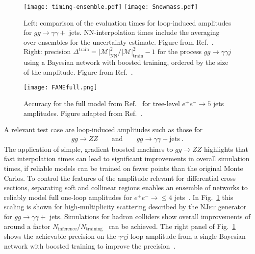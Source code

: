 \documentclass[submission,Phys]{SciPost}
\begin{document}
\begin{figure}[t]
    \centering
    \texttt{[image: timing-ensemble.pdf]}
    \hspace*{0.06\textwidth}
    \texttt{[image: Snowmass.pdf]}
    \caption{Left: comparison of the evaluation times for loop-induced amplitudes for $gg\to \gamma\gamma+$ jets. NN-interpolation times include the averaging over ensembles for the uncertainty estimate. Figure from Ref.~\cite{Aylett-Bullock:2021hmo}. Right: precision $\Delta^\text{train} = |\mathcal{M}|_\text{NN}^2/|\mathcal{M}|_\text{train}^2-1$ for the process $gg\to \gamma\gamma j$ using a Bayesian network with boosted training, ordered by the size of the amplitude. Figure from Ref.~\cite{Badger_future}.}
    \label{fig:nnamps-timing}
\end{figure}

\begin{figure}[b!]
    \texttt{[image: FAMEfull.png]}
    \caption{Accuracy for the full model from Ref.~\cite{Maitre:2021uaa}  for tree-level $e^+e^-\to 5$ jets amplitudes. Figure adapted from Ref.~\cite{Maitre:2021uaa}.}
    \label{fig:FAMEfull}
\end{figure}

A relevant test case are loop-induced amplitudes such as those for
%
\begin{align}
gg\to ZZ
\qquad \text{and} \qquad 
gg\to \gamma\gamma +\text{jets} \; . 
\end{align}
%
The application of simple, gradient boosted machines to $gg\to ZZ$ highlights that fast interpolation times can lead to significant improvements in overall simulation times, if reliable models can be trained on fewer points than the original Monte Carlos. To control the features of the amplitude relevant for differential cross sections, separating soft and collinear regions enables an ensemble of networks to reliably model full one-loop amplitudes for $e^+e^-\to \leq 4$ jets~\cite{Badger:2020uow}. In Fig.~\ref{fig:nnamps-timing} this scaling is shown for high-multiplicity scattering described by the \textsc{NJet} generator for $gg\to \gamma\gamma+$ jets. Simulations for hadron colliders show overall improvements of around a factor $N_\text{inference}/N_\text{training}$~\cite{Aylett-Bullock:2021hmo} can be achieved. The right panel of Fig.~\ref{fig:nnamps-timing} shows the achievable precision on the $\gamma \gamma j$ loop amplitude from a single Bayesian network with boosted training to improve the precision~\cite{bnn_early3,deep_errors,Bollweg:2019skg,Kasieczka:2020vlh}.
\end{document}
